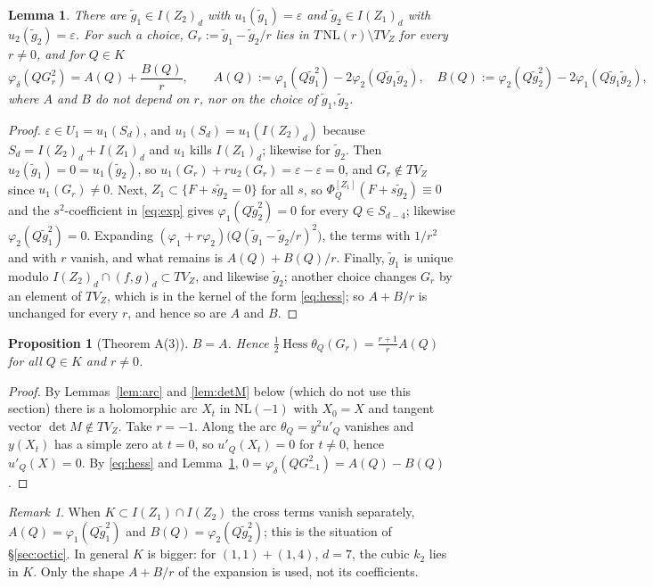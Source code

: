 \documentclass[11pt]{article}
\numberwithin{equation}{section}
\newtheorem{proposition}[theorem]{Proposition}
\newtheorem{lemma}[theorem]{Lemma}
\theoremstyle{remark}
\newtheorem{remark}[theorem]{Remark}
\newcommand{\NL}{\mathrm{NL}}
\newcommand{\VZ}{V_Z}
\newcommand{\Hess}{\operatorname{Hess}}
\newcommand{\gt}{\tilde g}
\begin{document}
\begin{lemma}\label{lem:AB}
There are $\gt_1\in I(Z_2)_d$ with $u_1(\gt_1)=\varepsilon$ and $\gt_2\in I(Z_1)_d$ with
$u_2(\gt_2)=\varepsilon$. For such a choice, $G_r:=\gt_1-\gt_2/r$ lies in $T\,\NL(r)\setminus T\VZ$ for every
$r\ne0$, and for $Q\in K$
\[
\varphi_\delta(QG_r^2)=A(Q)+\frac{B(Q)}{r},\qquad
A(Q):=\varphi_1(Q\gt_1^2)-2\varphi_2(Q\gt_1\gt_2),\quad B(Q):=\varphi_2(Q\gt_2^2)-2\varphi_1(Q\gt_1\gt_2),
\]
where $A$ and $B$ do not depend on $r$, nor on the choice of $\gt_1,\gt_2$.
\end{lemma}
\begin{proof}
$\varepsilon\in U_1=u_1(S_d)$, and $u_1(S_d)=u_1(I(Z_2)_d)$ because $S_d=I(Z_2)_d+I(Z_1)_d$ and $u_1$ kills
$I(Z_1)_d$; likewise for $\gt_2$. Then $u_2(\gt_1)=0=u_1(\gt_2)$, so $u_1(G_r)+ru_2(G_r)=\varepsilon-\varepsilon=0$,
and $G_r\notin T\VZ$ since $u_1(G_r)\ne0$. Next, $Z_1\subset\{F+s\gt_2=0\}$ for all $s$, so
$\Phi^{[Z_1]}_Q(F+s\gt_2)\equiv0$ and the $s^2$-coefficient in \eqref{eq:exp} gives $\varphi_1(Q\gt_2^2)=0$ for
every $Q\in S_{d-4}$; likewise $\varphi_2(Q\gt_1^2)=0$. Expanding
$(\varphi_1+r\varphi_2)\bigl(Q(\gt_1-\gt_2/r)^2\bigr)$, the terms with $1/r^2$ and with $r$ vanish, and what
remains is $A(Q)+B(Q)/r$. Finally, $\gt_1$ is unique modulo $I(Z_2)_d\cap(f,g)_d\subset T\VZ$, and likewise
$\gt_2$; another choice changes $G_r$ by an element of $T\VZ$, which is in the kernel of the form
\eqref{eq:hess}; so $A+B/r$ is unchanged for every $r$, and hence so are $A$ and $B$.
\end{proof}

\begin{proposition}[Theorem A(3)]\label{prop:law}
$B=A$. Hence $\tfrac12\Hess\theta_Q(G_r)=\frac{r+1}{r}A(Q)$ for all $Q\in K$ and $r\neq0$.
\end{proposition}
\begin{proof}
By Lemmas~\ref{lem:arc} and \ref{lem:detM} below (which do not use this section) there is a holomorphic arc
$X_t$ in $\NL(-1)$ with $X_0=X$ and tangent vector $\det M\notin T\VZ$. Take $r=-1$. Along the arc
$\theta_Q=y^2u'_Q$ vanishes and $y(X_t)$ has a simple zero at $t=0$, so $u'_Q(X_t)=0$ for $t\ne0$, hence
$u'_Q(X)=0$. By \eqref{eq:hess} and Lemma~\ref{lem:AB}, $0=\varphi_\delta(QG_{-1}^2)=A(Q)-B(Q)$.
\end{proof}

\begin{remark}\label{rem:cross}
When $K\subset I(Z_1)\cap I(Z_2)$ the cross terms vanish separately, $A(Q)=\varphi_1(Q\gt_1^2)$ and
$B(Q)=\varphi_2(Q\gt_2^2)$; this is the situation of \S\ref{sec:octic}. In general $K$ is bigger: for
$(1,1)+(1,4)$, $d=7$, the cubic $k_2$ lies in $K$. Only the shape $A+B/r$ of the expansion is used, not its
coefficients.
\end{remark}
\end{document}
